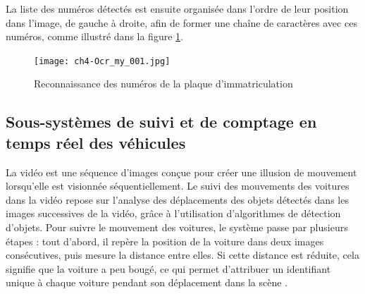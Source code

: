 La liste des numéros détectés est ensuite organisée dans l'ordre de leur position dans l'image, de gauche à droite, afin de former une chaîne de caractères avec ces numéros, comme illustré dans la figure \ref{fig:ch4-Ocr_my_001}.
\begin{figure}[H]
	\centering
	\texttt{[image: ch4-Ocr\_my\_001.jpg]}
	\caption{ Reconnaissance des numéros de la plaque d'immatriculation}
    \label{fig:ch4-Ocr_my_001}
\end{figure}

\subsection{Sous-systèmes de suivi et de comptage en temps réel des véhicules}\label{sec:traking}

La vidéo est une séquence d'images conçue pour créer une illusion de mouvement lorsqu'elle est visionnée séquentiellement. Le suivi des mouvements des voitures dans la vidéo repose sur l'analyse des déplacements des objets détectés dans les images successives de la vidéo, grâce à l'utilisation d'algorithmes de détection d'objets. Pour suivre le mouvement des voitures, le système passe par plusieurs étapes : tout d'abord, il repère la position de la voiture dans deux images consécutives, puis mesure la distance entre elles. Si cette distance est réduite, cela signifie que la voiture a peu bougé, ce qui permet d'attribuer un identifiant unique à chaque voiture pendant son déplacement dans la scène \cite{ch4_yolo_sort}.





